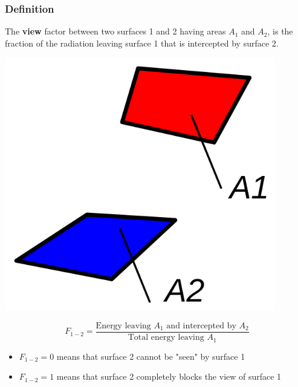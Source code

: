 \documentclass[11pt]{article}
\begin{document}
\subsubsection{Definition}
\label{sec:org89649fa}
The \textbf{view} factor between two surfaces 1 and 2 having areas \(A_1\) and \(A_2\), is the fraction of the radiation leaving surface 1 that is intercepted by surface 2.
\begin{center}
\includegraphics[width=.9\linewidth]{./images/view-factor-surfaces-a1-and-a2-diagram.png}
\end{center}
\[F_{1-2} = \frac{\text{Energy leaving $A_1$ and intercepted by $A_2$}}{\text{Total energy leaving $A_1$}}\]

\begin{itemize}
\item \(F_{1-2} = 0\) means that surface 2 cannot be "seen" by surface 1
\item \(F_{1-2} = 1\) means that surface 2 completely blocks the view of surface 1
\end{itemize}
\end{document}
